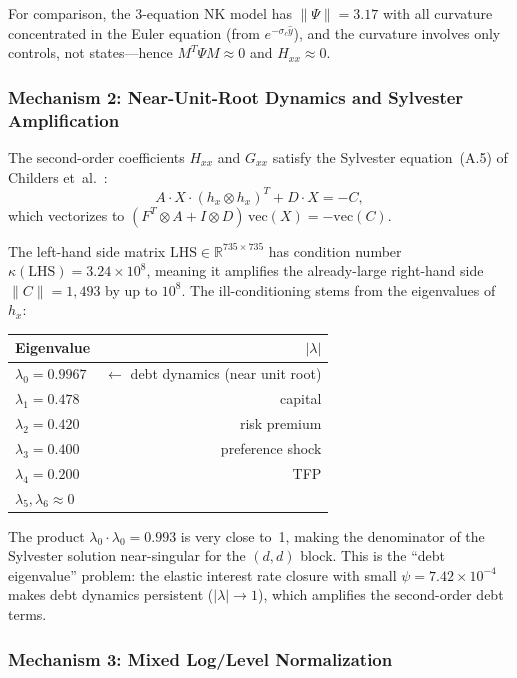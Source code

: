 \documentclass[11pt,a4paper]{article}
\theoremstyle{definition}
\begin{document}
	For comparison, the 3-equation NK model has $\|\Psi\| = 3.17$ with all curvature concentrated in the Euler equation (from $e^{-\sigma_c \hat{y}}$), and the curvature involves only controls, not states---hence $M^T \Psi M \approx 0$ and $H_{xx} \approx 0$.

	\subsubsection{Mechanism 2: Near-Unit-Root Dynamics and Sylvester Amplification}

	The second-order coefficients $H_{xx}$ and $G_{xx}$ satisfy the Sylvester equation~(A.5) of Childers et~al.~\cite{childers2024}:
	\[
		A \cdot X \cdot (h_x \otimes h_x)^T + D \cdot X = -C,
	\]
	which vectorizes to $(F^T \otimes A + I \otimes D)\,\text{vec}(X) = -\text{vec}(C)$.

	The left-hand side matrix $\text{LHS} \in \mathbb{R}^{735 \times 735}$ has condition number $\kappa(\text{LHS}) = 3.24 \times 10^8$, meaning it amplifies the already-large right-hand side $\|C\| = 1{,}493$ by up to $10^8$.
	The ill-conditioning stems from the eigenvalues of $h_x$:

	\begin{center}
	\begin{tabular}{lr}
		\toprule
		\textbf{Eigenvalue} & $|\lambda|$ \\
		\midrule
		$\lambda_0 = 0.9967$ & $\leftarrow$ debt dynamics (near unit root) \\
		$\lambda_1 = 0.478$ & capital \\
		$\lambda_2 = 0.420$ & risk premium \\
		$\lambda_3 = 0.400$ & preference shock \\
		$\lambda_4 = 0.200$ & TFP \\
		$\lambda_5, \lambda_6 \approx 0$ & \\
		\bottomrule
	\end{tabular}
	\end{center}

	The product $\lambda_0 \cdot \lambda_0 = 0.993$ is very close to~1, making the denominator of the Sylvester solution near-singular for the $(d, d)$ block.
	This is the ``debt eigenvalue'' problem: the elastic interest rate closure with small $\psi = 7.42 \times 10^{-4}$ makes debt dynamics persistent ($|\lambda| \to 1$), which amplifies the second-order debt terms.

	\subsubsection{Mechanism 3: Mixed Log/Level Normalization}
\end{document}
